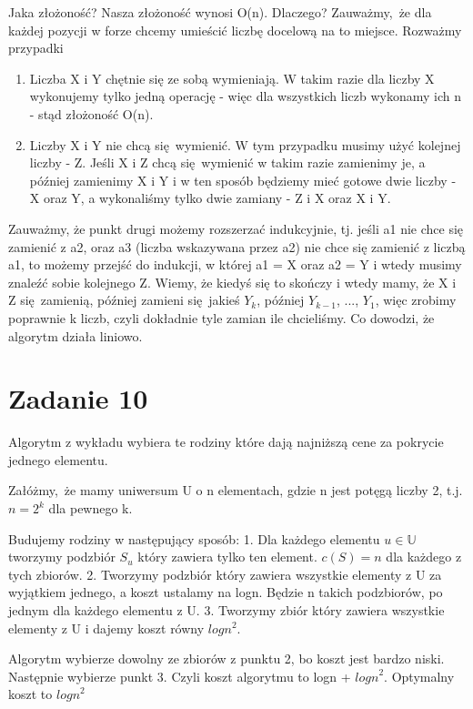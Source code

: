 \documentclass[12pt]{article}
\begin{document}
Jaka złożoność?
Nasza złożoność wynosi O(n). Dlaczego?
Zauważmy, że dla każdej pozycji w forze chcemy umieścić liczbę docelową na to miejsce. 
Rozważmy przypadki
\begin{enumerate}
    \item Liczba X i Y chętnie się ze sobą wymieniają.
    W takim razie dla liczby X wykonujemy tylko jedną operację - więc dla wszystkich liczb wykonamy ich n - stąd złożoność O(n).
    \item Liczby X i Y nie chcą się wymienić.
    W tym przypadku musimy użyć kolejnej liczby - Z. Jeśli X i Z chcą się wymienić w takim razie zamienimy je, a później zamienimy X i Y i w ten sposób będziemy mieć gotowe dwie liczby - X oraz Y, a wykonaliśmy tylko dwie zamiany - Z i X oraz X i Y.\\
\end{enumerate}

Zauważmy, że punkt drugi możemy rozszerzać indukcyjnie, tj. jeśli a1 nie chce się zamienić z a2, oraz a3 (liczba wskazywana przez a2) nie chce się zamienić z liczbą a1, to możemy przejść do indukcji, w której a1 = X oraz a2 = Y i wtedy musimy znaleźć sobie kolejnego Z. Wiemy, że kiedyś się to skończy i wtedy mamy, że X i Z się zamienią, później zamieni się jakieś $Y_k$, później $Y_{k-1}$, ..., $Y_1$, więc zrobimy poprawnie k liczb, czyli dokładnie tyle zamian ile chcieliśmy. 
Co dowodzi, że algorytm działa liniowo.



\section{Zadanie 10}
Algorytm z wykładu wybiera te rodziny które dają najniższą cene za pokrycie jednego elementu.

Załóżmy, że mamy uniwersum U o n elementach, gdzie n jest potęgą liczby 2, t.j. $n = 2^k$ dla pewnego k.

Budujemy rodziny w następujący sposób:
1. Dla każdego elementu $u \in \mathbb{U}$ tworzymy podzbiór $S_u$ który zawiera tylko ten element. $c(S) = n$ dla każdego z tych zbiorów.
2. Tworzymy podzbiór który zawiera wszystkie elementy z U za wyjątkiem jednego, a koszt ustalamy na logn. Będzie n takich podzbiorów, po jednym dla każdego elementu z U.
3. Tworzymy zbiór który zawiera wszystkie elementy z U i dajemy koszt równy $logn^2$. 

Algorytm wybierze dowolny ze zbiorów z punktu 2, bo koszt jest bardzo niski. Następnie wybierze punkt 3.
Czyli koszt algorytmu to logn + ${logn}^2$.
Optymalny koszt to ${logn}^2$
\end{document}
